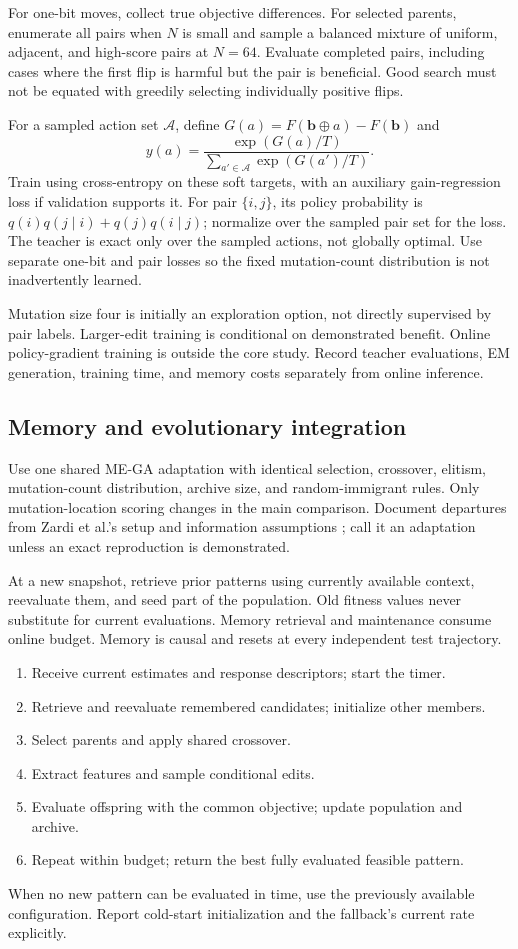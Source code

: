 \documentclass[conference]{IEEEtran}
\newcommand{\bvec}{\mathbf b}
\begin{document}
For one-bit moves, collect true objective differences. For selected parents, enumerate all pairs when $N$ is small and sample a balanced mixture of uniform, adjacent, and high-score pairs at $N=64$. Evaluate completed pairs, including cases where the first flip is harmful but the pair is beneficial. Good search must not be equated with greedily selecting individually positive flips.

For a sampled action set $\mathcal A$, define $G(a)=F(\bvec\oplus a)-F(\bvec)$ and
\[
y(a)=\frac{\exp(G(a)/T)}{\sum_{a'\in\mathcal A}\exp(G(a')/T)}.
\]
Train using cross-entropy on these soft targets, with an auxiliary gain-regression loss if validation supports it. For pair $\{i,j\}$, its policy probability is
$q(i)q(j\mid i)+q(j)q(i\mid j)$; normalize over the sampled pair set for the loss. The teacher is exact only over the sampled actions, not globally optimal. Use separate one-bit and pair losses so the fixed mutation-count distribution is not inadvertently learned.

Mutation size four is initially an exploration option, not directly supervised by pair labels. Larger-edit training is conditional on demonstrated benefit. Online policy-gradient training is outside the core study. Record teacher evaluations, EM generation, training time, and memory costs separately from online inference.

\subsection{Memory and evolutionary integration}
Use one shared ME-GA adaptation with identical selection, crossover, elitism, mutation-count distribution, archive size, and random-immigrant rules. Only mutation-location scoring changes in the main comparison. Document departures from Zardi et al.'s setup and information assumptions \cite{zardi}; call it an adaptation unless an exact reproduction is demonstrated.

At a new snapshot, retrieve prior patterns using currently available context, reevaluate them, and seed part of the population. Old fitness values never substitute for current evaluations. Memory retrieval and maintenance consume online budget. Memory is causal and resets at every independent test trajectory.
\begin{enumerate}[label=\arabic*.]
\item Receive current estimates and response descriptors; start the timer.
\item Retrieve and reevaluate remembered candidates; initialize other members.
\item Select parents and apply shared crossover.
\item Extract features and sample conditional edits.
\item Evaluate offspring with the common objective; update population and archive.
\item Repeat within budget; return the best fully evaluated feasible pattern.
\end{enumerate}
When no new pattern can be evaluated in time, use the previously available configuration. Report cold-start initialization and the fallback's current rate explicitly.
\end{document}
